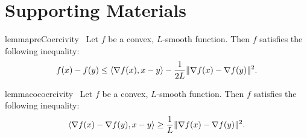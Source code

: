 
\chapter{Supporting Materials}


\begin{restatable}{lemma}{preCoercivity}~\label{lemma:pre-coercivity}
    Let \( f  \) be a convex, \( L  \)-smooth function. 
    Then \( f  \) satisfies the following inequality:
    \[ f(x) - f(y)  \leq  \left\langle\nabla f(x), x - y\right\rangle- \frac{1}{2L} \|\nabla f(x) - \nabla f(y)\|^2. \] 
\end{restatable}


\begin{restatable}{lemma}{cocoercivity}~\label{lemma:co-coercivity}
    Let \( f  \) be a convex, \( L  \)-smooth function. 
    Then \( f  \) satisfies the following inequality:
    \[ \left\langle\nabla f(x) - \nabla f(y), x - y\right\rangle \geq \frac{1}{L} \|\nabla f(x) - \nabla f(y)\|^2. \] 
\end{restatable}

